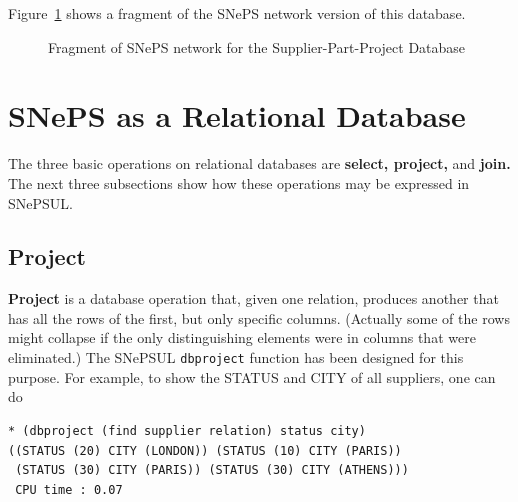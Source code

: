 \documentclass{book}
\begin{document}
Figure~\ref{dbfig1} shows a fragment of the SNePS network version of
this database.
\begin{figure}[tbp]
\caption{Fragment of SNePS network for the Supplier-Part-Project
Database}\label{dbfig1} 
\end{figure}

\section{SNePS as a Relational Database}
The three basic operations on relational databases are {\bf select,
project,} and {\bf join.}  The next three subsections show how these
operations may be expressed in SNePSUL.

\subsection{Project}
{\bf Project} is a database operation that, given one relation,
produces another that has all the rows of the first, but only specific
columns.  (Actually some of the rows might collapse if the only
distinguishing elements were in columns that were eliminated.)  The
SNePSUL {\tt dbproject} function has been designed for this purpose.
For example, to show the STATUS and CITY of all suppliers, one can do
\begin{verbatim}
* (dbproject (find supplier relation) status city)
((STATUS (20) CITY (LONDON)) (STATUS (10) CITY (PARIS))
 (STATUS (30) CITY (PARIS)) (STATUS (30) CITY (ATHENS)))
 CPU time : 0.07 
\end{verbatim}
\end{document}
